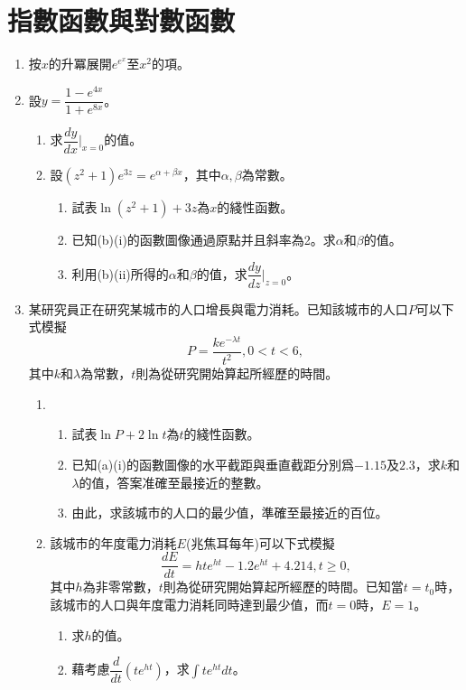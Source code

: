 \documentclass[12pt]{article}
\begin{document}
    \section{指數函數與對數函數}
    \begin{enumerate}
        \item 按$x$的升冪展開$e^{e^x}$至$x^2$的項。
        \item 設$y=\dfrac{1-e^{4x}}{1+e^{8x}}$。\begin{enumerate}
            \item 求$\dfrac{dy}{dx}\bigg|_{x=0}$的值。
            \item 設$(z^2+1)e^{3z}=e^{\alpha+\beta x}$，其中$\alpha,\beta$為常數。\begin{enumerate}
                \item 試表$\ln(z^2+1)+3z$為$x$的綫性函數。
                \item 已知(b)(i)的函數圖像通過原點并且斜率為2。求$\alpha$和$\beta$的值。
                \item 利用(b)(ii)所得的$\alpha$和$\beta$的值，求$\dfrac{dy}{dz}\bigg|_{z=0}$。
            \end{enumerate}
        \end{enumerate}
        \item 某研究員正在研究某城市的人口增長與電力消耗。已知該城市的人口$P$可以下式模擬\[P=\frac{ke^{-\lambda t}}{t^2}, 0<t<6,\]其中$k$和$\lambda$為常數，$t$則為從研究開始算起所經歷的時間。\begin{enumerate}
            \item \begin{enumerate}
                \item 試表$\ln{P}+2\ln{t}$為$t$的綫性函數。
                \item 已知(a)(i)的函數圖像的水平截距與垂直截距分別爲$-1.15$及$2.3$，求$k$和$\lambda$的值，答案准確至最接近的整數。
                \item 由此，求該城市的人口的最少值，準確至最接近的百位。
            \end{enumerate}
            \item 該城市的年度電力消耗$E$(兆焦耳每年)可以下式模擬\[\frac{dE}{dt}=hte^{ht}-1.2e^{ht}+4.214, t\geq 0,\]其中$h$為非零常數，$t$則為從研究開始算起所經歷的時間。已知當$t=t_0$時，該城市的人口與年度電力消耗同時達到最少值，而$t=0$時，$E=1$。\begin{enumerate}
                \item 求$h$的值。
                \item 藉考慮$\dfrac{d}{dt}(te^{ht})$，求$\int te^{ht} dt$。

\end{enumerate}
\end{enumerate}
\end{enumerate}
\end{document}
